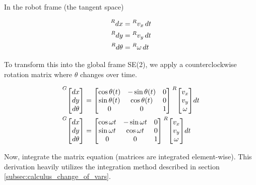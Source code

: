 In the robot frame (the tangent space)

\begin{align*}
  \prescript{R}{}{dx} &= \prescript{R}{}{v_x} \,dt \\
  \prescript{R}{}{dy} &= \prescript{R}{}{v_y} \,dt \\
  \prescript{R}{}{d\theta} &= \prescript{R}{}{\omega} \,dt
\end{align*}

To transform this into the global frame SE(2), we apply a counterclockwise
rotation matrix where $\theta$ changes over time.

\begin{align*}
  \prescript{G}{}{\begin{bmatrix}
    dx \\
    dy \\
    d\theta
  \end{bmatrix}} &=
  \begin{bmatrix}
    \cos\theta(t) & -\sin\theta(t) & 0 \\
    \sin\theta(t) &  \cos\theta(t) & 0 \\
                0 &              0 & 1
  \end{bmatrix}
  \prescript{R}{}{\begin{bmatrix}
    v_x \\
    v_y \\
    \omega
  \end{bmatrix}} dt \\
  \prescript{G}{}{\begin{bmatrix}
    dx \\
    dy \\
    d\theta
  \end{bmatrix}} &=
  \begin{bmatrix}
    \cos\omega t & -\sin\omega t & 0 \\
    \sin\omega t &  \cos\omega t & 0 \\
               0 &             0 & 1
  \end{bmatrix}
  \prescript{R}{}{\begin{bmatrix}
    v_x \\
    v_y \\
    \omega
  \end{bmatrix}} dt
\end{align*}

Now, integrate the matrix equation (matrices are integrated element-wise). This
derivation heavily utilizes the integration method described in section
\ref{subsec:calculus_change_of_vars}.

